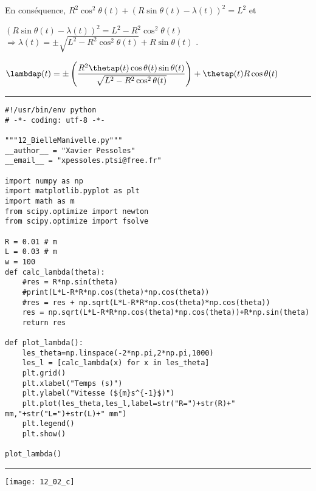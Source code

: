 En conséquence, 
$R^2\cos^2\theta(t)  + \left(R\sin\theta(t)  - \lambda(t)\right)^2 = L^2$ et 

$ \left(R\sin\theta(t)  - \lambda(t)\right)^2 = L^2 - R^2\cos^2\theta(t) $ 
$\Rightarrow    \lambda(t) = \pm\sqrt{L^2 - R^2\cos^2\theta(t)} + R\sin\theta(t) $ .
\else
\fi

\ifprof

$\lambdap(t) = \pm\left( \dfrac{R^2 \thetap(t) \cos\theta(t)\sin\theta(t)}{\sqrt{L^2 - R^2\cos^2\theta(t)}}\right) + \thetap(t)R\cos\theta(t) $ 

\else
\fi


\ifprof
\noindent\hrule
\begin{lstlisting}
#!/usr/bin/env python
# -*- coding: utf-8 -*-

"""12_BielleManivelle.py"""
__author__ = "Xavier Pessoles"
__email__ = "xpessoles.ptsi@free.fr"

import numpy as np
import matplotlib.pyplot as plt
import math as m
from scipy.optimize import newton
from scipy.optimize import fsolve

R = 0.01 # m
L = 0.03 # m
w = 100
def calc_lambda(theta):
    #res = R*np.sin(theta)
    #print(L*L-R*R*np.cos(theta)*np.cos(theta))
    #res = res + np.sqrt(L*L-R*R*np.cos(theta)*np.cos(theta))
    res = np.sqrt(L*L-R*R*np.cos(theta)*np.cos(theta))+R*np.sin(theta)
    return res

def plot_lambda():
    les_theta=np.linspace(-2*np.pi,2*np.pi,1000)
    les_l = [calc_lambda(x) for x in les_theta]
    plt.grid()
    plt.xlabel("Temps (s)")
    plt.ylabel("Vitesse (${m}s^{-1}$)")
    plt.plot(les_theta,les_l,label=str("R=")+str(R)+" mm,"+str("L=")+str(L)+" mm")
    plt.legend()
    plt.show()
    
plot_lambda()
\end{lstlisting}
\noindent\hrule

\begin{marginfigure}
\texttt{[image: 12\_02\_c]}
\end{marginfigure}
\else
\fi


